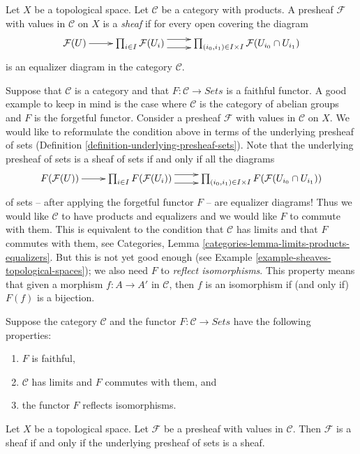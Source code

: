 \begin{definition}
\label{definition-sheaf-values-in-category}
Let $X$ be a topological space. Let $\mathcal{C}$ be
a category with products. A presheaf $\mathcal{F}$ with
values in $\mathcal{C}$ on $X$ is a {\it sheaf} 
if for every open covering the diagram
$$
\xymatrix{
\mathcal{F}(U) \ar[r]
&
\prod\nolimits_{i\in I}
\mathcal{F}(U_i)
\ar@<1ex>[r] \ar@<-1ex>[r]
&
\prod\nolimits_{(i_0, i_1) \in I\times I}
\mathcal{F}(U_{i_0} \cap U_{i_1})
}
$$
is an equalizer diagram in the category $\mathcal{C}$.
\end{definition}

\noindent
Suppose that $\mathcal{C}$ is a category and that
$F : \mathcal{C} \to \textit{Sets}$ is a faithful functor.
A good example to keep in mind is the case where $\mathcal{C}$
is the category of abelian groups and $F$ is the forgetful functor.
Consider a presheaf $\mathcal{F}$ with values in $\mathcal{C}$ on $X$.
We would like to reformulate the condition above in terms
of the underlying presheaf of sets
(Definition \ref{definition-underlying-presheaf-sets}).
Note that the underlying
presheaf of sets is a sheaf of sets if and only if all the
diagrams
$$
\xymatrix{
F(\mathcal{F}(U)) \ar[r]
&
\prod\nolimits_{i\in I}
F(\mathcal{F}(U_i))
\ar@<1ex>[r] \ar@<-1ex>[r]
&
\prod\nolimits_{(i_0, i_1) \in I\times I}
F(\mathcal{F}(U_{i_0} \cap U_{i_1}))
}
$$
of sets -- after applying the forgetful functor $F$ -- are
equalizer diagrams! Thus we would like $\mathcal{C}$ to have
products and equalizers and we would like $F$ to commute with
them. This is equivalent to the condition that $\mathcal{C}$
has limits and that $F$ commutes with them, see 
Categories, Lemma \ref{categories-lemma-limits-products-equalizers}.
But this is not yet good enough
(see Example \ref{example-sheaves-topological-spaces});
we also need $F$ to {\it reflect isomorphisms}.
This property means that given a morphism
$f : A \to A'$ in $\mathcal{C}$, then $f$ is
an isomorphism if (and only if) $F(f)$ is a bijection.

\begin{lemma}
\label{lemma-sheaves-structure}
Suppose the category $\mathcal{C}$ and
the functor $F : \mathcal{C} \to \textit{Sets}$
have the following properties:
\begin{enumerate}
\item $F$ is faithful,
\item $\mathcal{C}$ has limits and $F$ commutes with them, and
\item the functor $F$ reflects isomorphisms.
\end{enumerate}
Let $X$ be a topological space. Let $\mathcal{F}$
be a presheaf with values in $\mathcal{C}$.
Then $\mathcal{F}$ is a sheaf if and only if the
underlying presheaf of sets is a sheaf.
\end{lemma}

